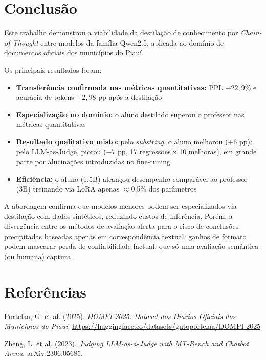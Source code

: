 \documentclass[12pt, a4paper]{article}
\begin{document}
\section{Conclusão}

Este trabalho demonstrou a viabilidade da destilação de conhecimento por
\textit{Chain-of-Thought} entre modelos da família Qwen2.5, aplicada ao domínio
de documentos oficiais dos municípios do Piauí.

Os principais resultados foram:

\begin{itemize}
  \item \textbf{Transferência confirmada nas métricas quantitativas:} PPL $-22{,}9\%$
        e acurácia de tokens $+2{,}98$ pp após a destilação
  \item \textbf{Especialização no domínio:} o aluno destilado superou o professor
        nas métricas quantitativas
  \item \textbf{Resultado qualitativo misto:} pelo \textit{substring}, o aluno
        melhorou ($+6$ pp); pelo LLM-as-Judge, piorou ($-7$ pp, 17 regressões x 10
        melhoras), em grande parte por alucinações introduzidas no fine-tuning
  \item \textbf{Eficiência:} o aluno (1,5B) alcançou desempenho comparável ao
        professor (3B) treinando via LoRA apenas $\approx$0,5\% dos parâmetros
\end{itemize}

A abordagem confirma que modelos menores podem ser especializados via destilação com
dados sintéticos, reduzindo custos de inferência. Porém, a divergência entre os
métodos de avaliação alerta para o risco de conclusões precipitadas baseadas apenas
em correspondência textual: ganhos de formato podem mascarar perda de confiabilidade
factual, que só uma avaliação semântica (ou humana) captura.

\section*{Referências}

\begin{enumerate}[label={[\arabic*]}]
  \item \label{dompi2025} Portelaa, G. et al. (2025). \textit{DOMPI-2025: Dataset dos
        Diários Oficiais dos Municípios do Piauí}.
        \url{https://huggingface.co/datasets/gutoportelaa/DOMPI-2025}
  \item \label{llmjudge} Zheng, L. et al. (2023). \textit{Judging LLM-as-a-Judge with
        MT-Bench and Chatbot Arena}. arXiv:2306.05685.
\end{enumerate}
\end{document}
